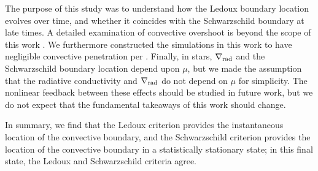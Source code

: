 The purpose of this study was to understand how the Ledoux boundary location evolves over time, and whether it coincides with the Schwarzschild boundary at late times.
A detailed examination of convective overshoot is beyond the scope of this work \citep[but see e.g.,][]{korre_etal_2019}.
We furthermore constructed the simulations in this work to have negligible convective penetration per \citet{anders_etal_2022}.
Finally, in stars, $\nabla_{\rm{rad}}$ and the Schwarzschild boundary location depend upon $\mu$, but we made the assumption that the radiative conductivity and $\nabla_{\rm{rad}}$ do not depend on $\mu$ for simplicity.
The nonlinear feedback between these effects should be studied in future work, but we do not expect that the fundamental takeaways of this work should change.

In summary, we find that the Ledoux criterion provides the instantaneous location of the convective boundary, and the Schwarzschild criterion provides the location of the convective boundary in a statistically stationary state; in this final state, the Ledoux and Schwarzschild criteria agree.
